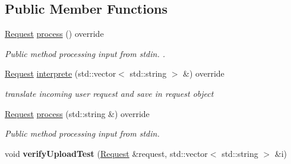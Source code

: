 \subsection*{Public Member Functions}
\begin{DoxyCompactItemize}
\item 
\hyperlink{classRequest}{Request} \hyperlink{classCli_aa2b3675ef3e3bb01ed0d1997460a0e28}{process} () override
\begin{DoxyCompactList}\small\item\em Public method processing input from stdin. . \end{DoxyCompactList}\item 
\hyperlink{classRequest}{Request} \hyperlink{classCli_af29a5d8a0c3863f69c0e21133dee2d1b}{interprete} (std\+::vector$<$ std\+::string $>$ \&) override
\begin{DoxyCompactList}\small\item\em translate incoming user request and save in request object \end{DoxyCompactList}\item 
\hyperlink{classRequest}{Request} \hyperlink{classCli_a4ee41556f8c3a736d813f0d937413da0}{process} (std\+::string \&) override
\begin{DoxyCompactList}\small\item\em Public method processing input from stdin. \end{DoxyCompactList}\item 
\mbox{\label{classCli_af21370e0e274a657bf2c9efceb18b6b3}} 
void {\bfseries verify\+Upload\+Test} (\hyperlink{classRequest}{Request} \&request, std\+::vector$<$ std\+::string $>$ \&i)
\end{DoxyCompactItemize}
